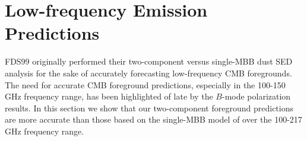 \documentclass{emulateapj}
\newcommand{\IRAS}{{\it IRAS}}
\begin{document}


\section{Low-frequency Emission Predictions}
FDS99 originally performed their two-component versus single-MBB dust SED 
analysis for the sake of accurately forecasting low-frequency CMB foregrounds.
The need for accurate CMB foreground predictions, especially in the 100-150 GHz
frequency range, has been highlighted of late by the \cite{bicep2} $B$-mode 
polarization results. In this section we show that our two-component foreground
predictions are more accurate than those based on the single-MBB model of 
\cite{planckdust} over the 100-217 GHz frequency range.





\end{document}
